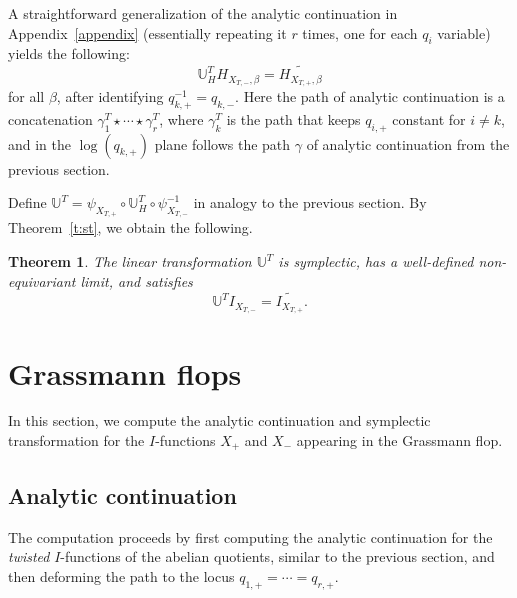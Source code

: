 \documentclass[pdftex]{sigma}
\newtheorem{Theorem}{Theorem}[section]
\numberwithin{equation}{section}
\newcommand{\UU}{\mathbb{U}}
\begin{document}
A straightforward generalization of the analytic continuation in Appendix~\ref{appendix} (essentially repeating it $r$ times, one for each $q_i$ variable) yields the following:
\[
\UU_H^T H_{X_{T,-}, \beta} = \widetilde{H_{X_{T,+}, \beta}}
\]
for all $\beta$, after identifying $q_{k, +}^{-1} = q_{k, -}$. Here the path of analytic continuation is a concatenation
$\gamma_1^T \star \cdots \star \gamma_r^T$,
where $\gamma_k^T$ is the path that keeps $q_{i, +}$ constant for $i \neq k$, and in the $ \log(q_{k, +})$ plane follows the path $\gamma$ of analytic continuation from the previous section.

Define
$\UU^T = \psi_{X_{T,+}} \circ \UU_H^T \circ \psi_{X_{T,-}}^{-1}$
in analogy to the previous section. By Theorem~\ref{t:st}, we obtain the following.
\begin{Theorem} %
The linear transformation $\UU^T$ is symplectic, has a well-defined non-equivariant limit, and satisfies
\[
\UU^T I_{X_{T,-}} =\widetilde{I_{X_{T,+}}}.
\]
\end{Theorem}


\section{Grassmann flops}
In this section, we compute the analytic continuation and symplectic transformation for the $I$-functions $X_+$ and $X_-$ appearing in the Grassmann flop.

\subsection{Analytic continuation}
The computation proceeds by first computing the analytic continuation for the \emph{twisted} $I$-functions of the abelian quotients, similar to the previous section, and then deforming the path to the locus $q_{1, +} = \cdots = q_{r, +}$.
\end{document}
